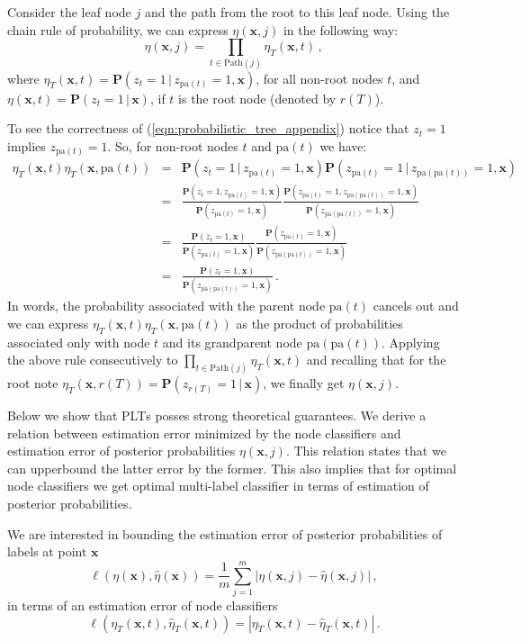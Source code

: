 \documentclass{article}
\newcommand{\Algo}[1]{\textsc{#1}}
\renewcommand{\vec}[1]{\boldsymbol{#1}}
\newcommand{\bx}{\vec{x}}
\newcommand{\heta}{\hat{\eta}}
\newcommand{\pa}[1]{\mathrm{pa}(#1)}
\newcommand{\Path}[1]{\mathrm{Path}(#1)}
\newcommand{\prob}{\mathbf{P}}
\newcommand{\given}{\, | \,}
\begin{document}
Consider the leaf node $j$ and the path from the root to this leaf node. Using the chain rule of probability, we can express $\eta(\bx, j)$ in the following way:
\begin{equation}
\eta(\bx, j) = \prod_{t \in \Path{j}} \eta_T(\bx, t)\,,
\label{eqn:probabilistic_tree_appendix}
\end{equation}
where $\eta_T(\bx, t) = \prob(z_t = 1 \given z_{\pa{t}} =1, \bx)$, for all non-root nodes $t$, and $\eta(\bx, t) = \prob(z_t = 1 \given \bx)$, if $t$ is the root node (denoted by $r(T)$). 

To see the correctness of (\ref{eqn:probabilistic_tree_appendix}) notice that $z_{t} = 1$ implies $z_{\pa{t}} = 1$. So, for non-root nodes $t$ and $\pa{t}$ we have:
\begin{eqnarray*}
\eta_T(\bx,t) \eta_T(\bx, \pa{t}) & = &  \prob(z_t = 1 \given z_{\pa{t}} =1, \bx)\prob(z_{\pa{t}} = 1 \given z_{\pa{\pa{t}}} =1, \bx)\\
& = & \frac{\prob(z_t = 1 , z_{\pa{t}} =1, \bx)}{\prob(z_{\pa{t}} =1, \bx)} \frac{\prob(z_{\pa{t}} = 1, z_{\pa{\pa{t}}} =1, \bx)}{\prob(z_{\pa{\pa{t}}} =1, \bx)} \\
& = & \frac{\prob(z_t = 1, \bx)}{\prob(z_{\pa{t}} =1, \bx)} \frac{\prob(z_{\pa{t}} = 1, \bx)}{\prob(z_{\pa{\pa{t}}} =1, \bx)} \\
& = & \frac{\prob(z_t = 1, \bx)}{\prob(z_{\pa{\pa{t}}} =1, \bx)} \,.
\end{eqnarray*}
In words, the probability associated with the parent node $\pa{t}$ cancels out and we can express $\eta_T(\bx,t) \eta_T(\bx, \pa{t})$ as the product of probabilities associated only with node $t$ and its grandparent node $\pa{\pa{t}}$. 
%
Applying the above rule consecutively to $\prod_{t \in \Path{j}} \eta_T(\bx, t)$ and recalling that for the root note $\eta_T(\bx, r(T)) = \prob(z_{r(T)} = 1 \given \bx)$, we finally get $\eta(\bx, j)$. 

Below we show that \Algo{PLT}s posses strong theoretical guarantees. We derive a relation between  estimation error minimized by the node classifiers and estimation error of posterior probabilities $\eta(\bx,j)$. This relation states that we can upperbound the latter error by the former. This also implies that for optimal node classifiers we get optimal multi-label classifier in terms of estimation of posterior probabilities.


We are interested in bounding the estimation error of posterior probabilities of labels at point $\bx$
$$
\ell(\eta(\bx),\heta(\bx)) = \frac{1}{m} \sum_{j=1}^m |\eta(\bx, j) - \heta(\bx, j)| \,,
$$
in terms of an estimation error of node classifiers
$$
\ell(\eta_T(\bx, t), \heta_T(\bx, t)) = |\eta_T(\bx, t) - \heta_T(\bx, t)  | \,.
$$
\end{document}

